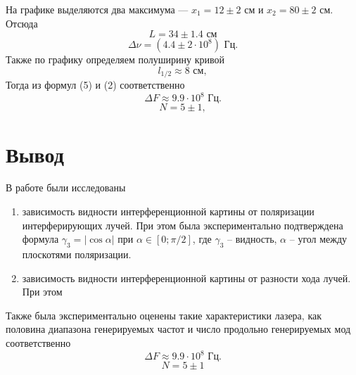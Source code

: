 \documentclass[a4paper,12pt]{article}
\begin{document}
\noindent На графике выделяются два максимума --- $x_1 = 12\pm2$ см и $x_2 = 80\pm2$ см. Отсюда 
$$
L = 34\pm1.4 \text{ см}
$$
$$
\Delta \nu = (4.4 \pm2 \cdot 10^8) \text{ Гц}.
$$
Также по графику определяем полуширину кривой
$$
l_{1/2} \approx 8 \text{ см},
$$
Тогда из формул (5) и (2) соответственно 
$$
\Delta F \approx 9.9 \cdot 10^8 \text{ Гц}.
$$
$$
N = 5\pm1, 
$$

\section*{Вывод}
В работе были исследованы 
\begin{enumerate}
    \item зависимость видности интерференционной картины от поляризации интерферирующих лучей. При этом была экспериментально подтверждена формула $\gamma_3 = |\cos \alpha|$ при $\alpha \in [0; \pi/2]$, где $\gamma_3$ -- видность, $\alpha$ -- угол между плоскотями поляризации.
    \item зависимость видности интерференционной картины от разности хода лучей. При этом 
\end{enumerate}

\noindent Также была экспериментально оценены такие характеристики лазера, как половина диапазона генерируемых частот и число продольно генерируемых мод соответственно
$$
\Delta F \approx 9.9 \cdot 10^8 \text{ Гц}.
$$
$$
    N = 5\pm1
$$
\end{document}
